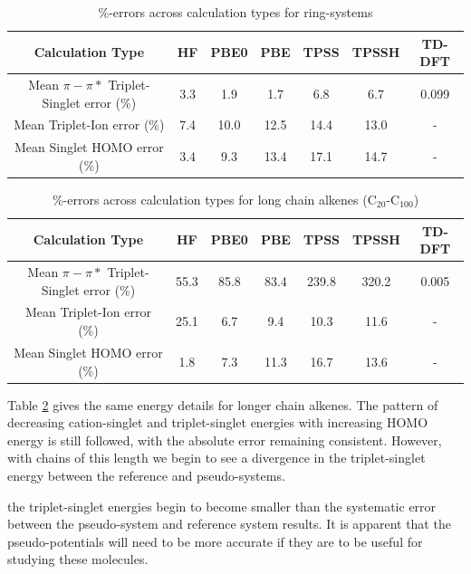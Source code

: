 \documentclass[journal=jctcce,manuscript=article]{achemso}
\begin{document}
\begin{table}[h]
\caption{\%-errors across calculation types for ring-systems}
\begin{tabular}{c c c c c c c}
\hline
Calculation Type & HF & PBE0 & PBE & TPSS & TPSSH & TD-DFT \\
\hline\hline
Mean \(\pi - \pi*\) Triplet-Singlet error (\%) & 3.3 & 1.9 & 1.7 & 6.8 & 6.7 & 0.099 \\
Mean Triplet-Ion error (\%) & 7.4 & 10.0 & 12.5 & 14.4 & 13.0 & - \\
Mean Singlet HOMO error (\%) & 3.4  & 9.3  & 13.4 & 17.1 & 14.7 & - \\
\hline
\end{tabular}
\label{table:ring_system_errors}
\end{table}

\begin{table}[h]
\caption{\%-errors across calculation types for long chain alkenes (C\(_{20}\)-C\(_{100}\))}
\begin{tabular}{c c c c c c c}
\hline\hline
Calculation Type & HF & PBE0 & PBE & TPSS & TPSSH & TD-DFT \\
\hline
Mean \(\pi - \pi*\) Triplet-Singlet error (\%) & 55.3 & 85.8 & 83.4 & 239.8 & 320.2 & 0.005 \\
Mean Triplet-Ion error (\%) & 25.1 & 6.7 & 9.4 & 10.3 & 11.6 & - \\
Mean Singlet HOMO error (\%) & 1.8 & 7.3 & 11.3 & 16.7 & 13.6 & - \\
\hline
\end{tabular}
\label{table:long_alkene_errors}
\end{table}

Table \ref{table:long_alkene_errors} gives the same energy details for longer chain alkenes. The pattern of decreasing cation-singlet and triplet-singlet energies with increasing HOMO energy is still followed, with the absolute error remaining consistent. However, with chains of this length we begin to see a divergence in the triplet-singlet energy between the reference and pseudo-systems. 

 the triplet-singlet energies begin to become smaller than the systematic error between the pseudo-system and reference system results. It is apparent that the pseudo-potentials will need to be more accurate if they are to be useful for studying these molecules.
\end{document}
